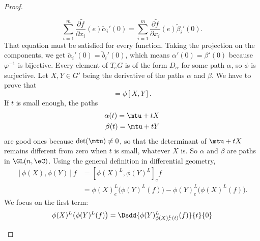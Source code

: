 \begin{proof}
\begin{subproof}
\begin{equation}
                \sum_{i=1}^m\frac{ \partial \tilde f }{ \partial x_i }(e)\tilde \alpha_i'(0)=\sum_{i=1}^m\frac{ \partial \tilde f }{ \partial x_i }(e)\tilde \beta_i'(0).
            \end{equation}
            That equation must be satisfied for every function. Taking the projection on the components, we get \( \tilde \alpha_i'(0)=\tilde b_i'(0)\), which means \( \alpha'(0)=\beta'(0)\) because \( \varphi^{-1}\) is bijective.
            Every element of \( T_eG\) is of the form \( D_{\alpha}\) for some path \( \alpha\), so \( \phi\) is surjective.
            Let \( X,Y\in G'\) being the derivative of the paths \( \alpha\) and \( \beta\). We have to prove that
            \begin{equation}
                [\phi(X),\phi(Y)]=\phi[X,Y].
            \end{equation}
            If \( t\) is small enough, the paths
            \begin{subequations}
                \begin{align}
                    \alpha(t)=\mtu+tX\\
                    \beta(t)=\mtu+tY\\
                \end{align}
            \end{subequations}
            are good ones because \( \det(\mtu)\neq 0\), so that the determinant of \( \mtu+tX\) remains different from zero when \( t\) is small, whatever \( X\) is. So \( \alpha\) and \( \beta\) are paths in \( \GL(n,\eC)\). Using the general definition in differential geometry,
            \begin{subequations}        \label{SUBEQSooCYRDooFOdLrn}
                \begin{align}
                    [\phi(X),\phi(Y)]f&=[\phi(X)^L,\phi(Y)^L]_ef\\
                    &=\phi(X)^L_e\big( \phi(Y)^L(f) \big)-\phi(Y)^L_e\big( \phi(X)^L(f) \big) \label{SUBEQooOPUAooZYsZlX}.
                \end{align}
            \end{subequations}
            We focus on the first term:
            \begin{subequations}        \label{SUBEQooTUNFooFkDmuP}
                \begin{align}
                    \phi(X)^L\big( \phi(Y)^L(f) \big)&=\Dsdd{ \phi(Y)^L_{\phi(X)^L_e(t)}(f) }{t}{0}\\

\end{align}
\end{subequations}
\end{subproof}
\end{proof}
